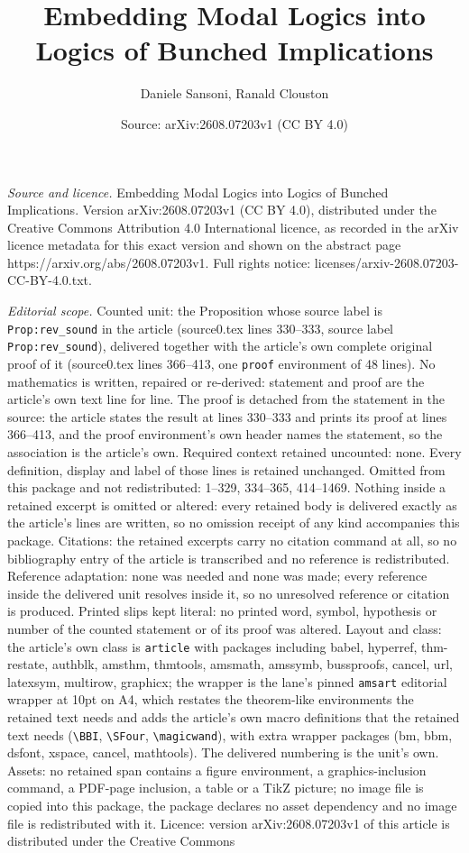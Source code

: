\documentclass[10pt,a4paper]{amsart}
\title[Embedding Modal Logics into Logics of Bunched Implications]{Embedding Modal Logics into Logics of Bunched Implications}
\author{Daniele Sansoni, Ranald Clouston}
\date{Source: arXiv:2608.07203v1 (CC BY 4.0)}
\begin{document}
\maketitle

\noindent\emph{Source and licence.} Embedding Modal Logics into Logics of Bunched Implications. Version arXiv:2608.07203v1 (CC BY 4.0), distributed under the Creative Commons Attribution 4.0 International licence, as recorded in the arXiv licence metadata for this exact version and shown on the abstract page https://arxiv.org/abs/2608.07203v1. Full rights notice: licenses/arxiv-2608.07203-CC-BY-4.0.txt.\par\smallskip

\noindent\textit{Editorial scope.} Counted unit: the Proposition whose source label is \texttt{Prop:rev\_sound} in the article (source0.tex lines 330--333, source label \texttt{Prop:rev\_sound}), delivered together with the article's own complete original proof of it (source0.tex lines 366--413, one \texttt{proof} environment of 48 lines). No mathematics is written, repaired or re-derived: statement and proof are the article's own text line for line. The proof is detached from the statement in the source: the article states the result at lines 330--333 and prints its proof at lines 366--413, and the proof environment's own header names the statement, so the association is the article's own. Required context retained uncounted: none. Every definition, display and label of those lines is retained unchanged. Omitted from this package and not redistributed: 1--329, 334--365, 414--1469. Nothing inside a retained excerpt is omitted or altered: every retained body is delivered exactly as the article's lines are written, so no omission receipt of any kind accompanies this package. Citations: the retained excerpts carry no citation command at all, so no bibliography entry of the article is transcribed and no reference is redistributed. Reference adaptation: none was needed and none was made; every reference inside the delivered unit resolves inside it, so no unresolved reference or citation is produced. Printed slips kept literal: no printed word, symbol, hypothesis or number of the counted statement or of its proof was altered. Layout and class: the article's own class is \texttt{article} with packages including babel, hyperref, thm-restate, authblk, amsthm, thmtools, amsmath, amssymb, bussproofs, cancel, url, latexsym, multirow, graphicx; the wrapper is the lane's pinned \texttt{amsart} editorial wrapper at 10pt on A4, which restates the theorem-like environments the retained text needs and adds the article's own macro definitions that the retained text needs (\texttt{\textbackslash BBI}, \texttt{\textbackslash SFour}, \texttt{\textbackslash magicwand}), with extra wrapper packages (bm, bbm, dsfont, xspace, cancel, mathtools). The delivered numbering is the unit's own. Assets: no retained span contains a figure environment, a graphics-inclusion command, a PDF-page inclusion, a table or a TikZ picture; no image file is copied into this package, the package declares no asset dependency and no image file is redistributed with it. Licence: version arXiv:2608.07203v1 of this article is distributed under the Creative Commons 
\end{document}
